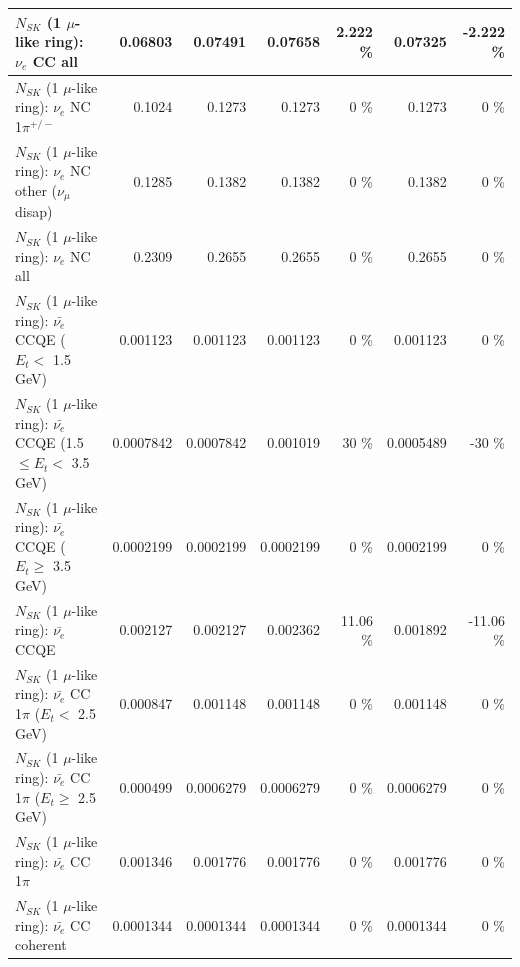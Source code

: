 \begin{table}
\begin{tabular}{| l | r | r | r  r | r  r |}
                                  $N_{SK}$ (1 $\mu$-like ring): $\nu_{e}$ CC all &         0.06803 &         0.07491 &         0.07658 &    2.222 \%  &         0.07325 &   -2.222 \%  \\ 
\hline
                           $N_{SK}$ (1 $\mu$-like ring): $\nu_e$ NC 1$\pi^{+/-}$ &          0.1024 &          0.1273 &          0.1273 &        0 \%  &          0.1273 &        0 \%  \\ 
                $N_{SK}$ (1 $\mu$-like ring): $\nu_e$ NC other ($\nu_\mu$ disap) &          0.1285 &          0.1382 &          0.1382 &        0 \%  &          0.1382 &        0 \%  \\ 
                                  $N_{SK}$ (1 $\mu$-like ring): $\nu_{e}$ NC all &          0.2309 &          0.2655 &          0.2655 &        0 \%  &          0.2655 &        0 \%  \\ 
\hline
\hline
\hline
            $N_{SK}$ (1 $\mu$-like ring): $\bar{\nu_e}$ CCQE ($E_{t} <$ 1.5 GeV) &        0.001123 &        0.001123 &        0.001123 &        0 \%  &        0.001123 &        0 \%  \\ 
   $N_{SK}$ (1 $\mu$-like ring): $\bar{\nu_e}$ CCQE (1.5 $\leq E_{t} <$ 3.5 GeV) &       0.0007842 &       0.0007842 &        0.001019 &       30 \%  &       0.0005489 &      -30 \%  \\ 
         $N_{SK}$ (1 $\mu$-like ring): $\bar{\nu_e}$ CCQE ($E_{t} \geq$ 3.5 GeV) &       0.0002199 &       0.0002199 &       0.0002199 &        0 \%  &       0.0002199 &        0 \%  \\ 
\hline
                                $N_{SK}$ (1 $\mu$-like ring): $\bar{\nu_e}$ CCQE &        0.002127 &        0.002127 &        0.002362 &    11.06 \%  &        0.001892 &   -11.06 \%  \\ 
\hline
       $N_{SK}$ (1 $\mu$-like ring): $\bar{\nu_e}$ CC 1$\pi$ ($E_{t} <$ 2.5 GeV) &        0.000847 &        0.001148 &        0.001148 &        0 \%  &        0.001148 &        0 \%  \\ 
    $N_{SK}$ (1 $\mu$-like ring): $\bar{\nu_e}$ CC 1$\pi$ ($E_{t} \geq$ 2.5 GeV) &        0.000499 &       0.0006279 &       0.0006279 &        0 \%  &       0.0006279 &        0 \%  \\ 
\hline
                           $N_{SK}$ (1 $\mu$-like ring): $\bar{\nu_e}$ CC 1$\pi$ &        0.001346 &        0.001776 &        0.001776 &        0 \%  &        0.001776 &        0 \%  \\ 
                         $N_{SK}$ (1 $\mu$-like ring): $\bar{\nu_e}$ CC coherent &       0.0001344 &       0.0001344 &       0.0001344 &        0 \%  &       0.0001344 &        0 \%  \\ 

\end{tabular}
\end{table}
